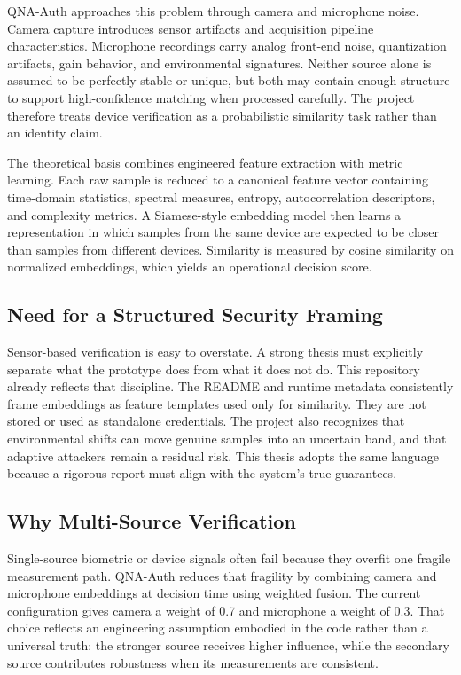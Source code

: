 \documentclass[12pt]{report}
\begin{document}
QNA-Auth approaches this problem through camera and microphone noise. Camera capture introduces sensor artifacts and acquisition pipeline characteristics. Microphone recordings carry analog front-end noise, quantization artifacts, gain behavior, and environmental signatures. Neither source alone is assumed to be perfectly stable or unique, but both may contain enough structure to support high-confidence matching when processed carefully. The project therefore treats device verification as a probabilistic similarity task rather than an identity claim.

The theoretical basis combines engineered feature extraction with metric learning. Each raw sample is reduced to a canonical feature vector containing time-domain statistics, spectral measures, entropy, autocorrelation descriptors, and complexity metrics. A Siamese-style embedding model then learns a representation in which samples from the same device are expected to be closer than samples from different devices. Similarity is measured by cosine similarity on normalized embeddings, which yields an operational decision score.

\subsection{Need for a Structured Security Framing}
Sensor-based verification is easy to overstate. A strong thesis must explicitly separate what the prototype does from what it does not do. This repository already reflects that discipline. The README and runtime metadata consistently frame embeddings as feature templates used only for similarity. They are not stored or used as standalone credentials. The project also recognizes that environmental shifts can move genuine samples into an uncertain band, and that adaptive attackers remain a residual risk. This thesis adopts the same language because a rigorous report must align with the system's true guarantees.

\subsection{Why Multi-Source Verification}
Single-source biometric or device signals often fail because they overfit one fragile measurement path. QNA-Auth reduces that fragility by combining camera and microphone embeddings at decision time using weighted fusion. The current configuration gives camera a weight of 0.7 and microphone a weight of 0.3. That choice reflects an engineering assumption embodied in the code rather than a universal truth: the stronger source receives higher influence, while the secondary source contributes robustness when its measurements are consistent.
\end{document}
